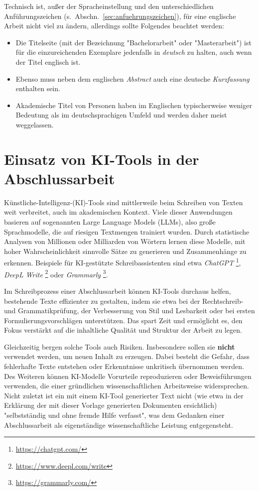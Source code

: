 Technisch ist, außer der Spracheinstellung und den unterschiedlichen
Anführungszeichen (s.\ Abschn.~\ref{sec:anfuehrungszeichen}), für eine
englische Arbeit nicht viel zu ändern, allerdings sollte Folgendes beachtet
werden:
%
\begin{itemize}
    \item Die Titelseite (mit der Bezeichnung "Bachelorarbeit" oder
    "Masterarbeit") ist für die einzureichenden Exemplare jedenfalls in
    \emph{deutsch} zu halten, auch wenn der Titel englisch ist.
    \item Ebenso muss neben dem englischen \emph{Abstract} auch eine deutsche
    \emph{Kurzfassung} enthalten sein. %
    \item Akademische Titel von Personen haben im Englischen typischerweise
    weniger Bedeutung als im deutschsprachigen Umfeld und werden daher meist
    weggelassen.
\end{itemize}


\section{Einsatz von KI-Tools in der Abschlussarbeit}

Künstliche-Intelligenz-(KI)-Tools sind mittlerweile beim Schreiben von Texten
weit verbreitet, auch im akademischen Kontext. Viele dieser Anwendungen
basieren auf sogenannten Large Language Models (LLMs), also große
Sprachmodelle, die auf riesigen Textmengen trainiert wurden. Durch statistische
Analysen von Millionen oder Milliarden von Wörtern lernen diese Modelle, mit
hoher Wahrscheinlichkeit sinnvolle Sätze zu generieren und Zusammenhänge zu
erkennen. Beispiele für KI-gestützte Schreibassistenten sind etwa
\emph{ChatGPT}%
\footnote{\url{https://chatgpt.com/}}, \emph{DeepL Write}%
\footnote{\url{https://www.deepl.com/write}} oder \emph{Grammarly}%
\footnote{\url{https://grammarly.com/}}.

Im Schreibprozess einer Abschlussarbeit können KI-Tools durchaus helfen,
bestehende Texte effizienter zu gestalten, indem sie etwa bei der Rechtschreib-
und Grammatikprüfung, der Verbesserung von Stil und Lesbarkeit oder bei ersten
Formulierungsvorschlägen unterstützen. Das spart Zeit und ermöglicht es, den
Fokus verstärkt auf die inhaltliche Qualität und Struktur der Arbeit zu legen.

Gleichzeitig bergen solche Tools auch Risiken. Insbesondere sollen sie
\textbf{nicht} verwendet werden, um neuen Inhalt zu erzeugen. Dabei besteht die
Gefahr, dass fehlerhafte Texte entstehen oder Erkenntnisse unkritisch
übernommen werden. Des Weiteren können KI-Modelle Vorurteile reproduzieren oder
Beweisführungen verwenden, die einer gründlichen wissenschaftlichen Arbeitsweise
widersprechen. Nicht zuletzt ist ein mit einem KI-Tool generierter Text nicht
(wie etwa in der Erklärung der mit dieser Vorlage generierten Dokumenten
ersichtlich) "selbstständig und ohne fremde Hilfe verfasst", was dem Gedanken
einer Abschlussarbeit als eigenständige wissenschaftliche Leistung
entgegensteht.

